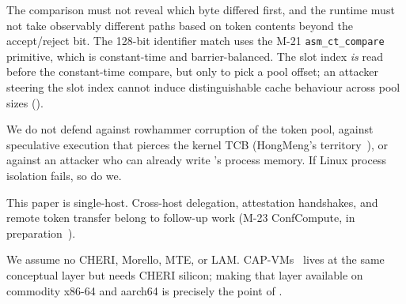 The comparison must not reveal which byte differed first, and the
runtime must not take observably different paths based on token
contents beyond the accept/reject bit. The 128-bit identifier match
uses the M-21 \texttt{asm\_ct\_compare} primitive, which is
constant-time and barrier-balanced. The slot index \emph{is} read
before the constant-time compare, but only to pick a pool offset; an
attacker steering the slot index cannot induce distinguishable cache
behaviour across pool sizes ().

We do not defend against rowhammer corruption of the token pool,
against speculative execution that pierces the kernel TCB (HongMeng's
territory~\cite{hongmeng}), or against an attacker who can already
write \sysname's process memory. If Linux process isolation fails,
so do we.

This paper is single-host. Cross-host delegation, attestation
handshakes, and remote token transfer belong to follow-up work
(M-23 ConfCompute, in preparation~\cite{astra-confcompute}).

We assume no CHERI, Morello, MTE, or LAM. CAP-VMs~\cite{capvms} lives
at the same conceptual layer but needs CHERI silicon; making that
layer available on commodity x86-64 and aarch64 is precisely the
point of \sysname.
